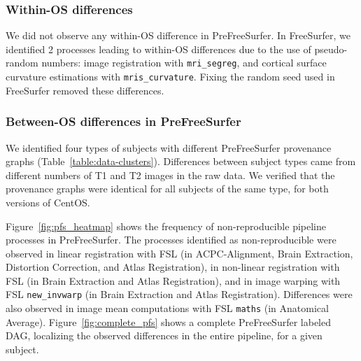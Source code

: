 \subsubsection{Within-OS differences}

We did not observe any within-OS difference in PreFreeSurfer. In
FreeSurfer, we identified 2 processes leading to within-OS differences due
to the use of pseudo-random numbers: image registration with
\texttt{mri\_segreg}, and cortical surface curvature estimations with
\texttt{mris\_curvature}. Fixing the random seed used in FreeSurfer removed
these differences.

\subsubsection{Between-OS differences in PreFreeSurfer}

We identified four types of subjects with different PreFreeSurfer
provenance graphs (Table~\ref{table:data-clusters}). Differences between
subject types came from different numbers of T1 and T2 images in the
raw data. We verified that
the provenance graphs were identical for all subjects of the same type, for
both versions of CentOS.

Figure~\ref{fig:pfs_heatmap} shows the frequency of non-reproducible pipeline processes
in PreFreeSurfer.
The processes identified as non-reproducible were observed in linear registration
with FSL \flirt (in ACPC-Alignment, Brain Extraction, Distortion Correction, and
Atlas Registration), in non-linear registration with FSL \fnirt (in Brain Extraction
and Atlas Registration), and in image warping with FSL \texttt{new\_invwarp} (in Brain Extraction
and Atlas Registration). Differences were also observed in image mean
computations with FSL \texttt{maths}  (in Anatomical Average).
Figure~\ref{fig:complete_pfs} shows a complete PreFreeSurfer labeled DAG, localizing
the observed differences in the entire pipeline, for a given subject.

